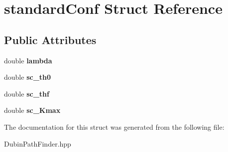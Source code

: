 \hypertarget{structstandard_conf}{}\section{standard\+Conf Struct Reference}
\label{structstandard_conf}
\subsection*{Public Attributes}
\begin{DoxyCompactItemize}
\item 
\mbox{\label{structstandard_conf_ac5a8976654eddd1c14b2aab5f4401943}} 
double {\bfseries lambda}
\item 
\mbox{\label{structstandard_conf_a105f1c9c8b50dc1f82ded42d04efeddb}} 
double {\bfseries sc\+\_\+th0}
\item 
\mbox{\label{structstandard_conf_a10bf9ad5cc1f29e5414bcad2d762273c}} 
double {\bfseries sc\+\_\+thf}
\item 
\mbox{\label{structstandard_conf_a394472a69fcea7d55ff5925a878e4d2d}} 
double {\bfseries sc\+\_\+\+Kmax}
\end{DoxyCompactItemize}


The documentation for this struct was generated from the following file\+:\begin{DoxyCompactItemize}
\item 
Dubin\+Path\+Finder.\+hpp\end{DoxyCompactItemize}
